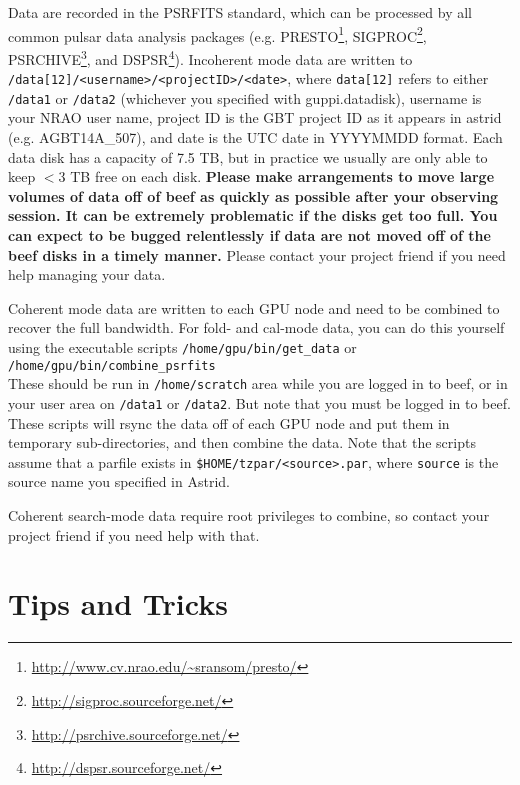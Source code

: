 Data are recorded in the PSRFITS standard, which can be processed by
all common pulsar data analysis packages
(e.g. PRESTO\footnote{\url{http://www.cv.nrao.edu/~sransom/presto/}},
SIGPROC\footnote{\url{http://sigproc.sourceforge.net/}},
PSRCHIVE\footnote{\url{http://psrchive.sourceforge.net/}}, and
DSPSR\footnote{\url{http://dspsr.sourceforge.net/}}).  Incoherent mode
data are written to \texttt{/data[12]/<username>/<projectID>/<date>},
where \texttt{data[12]} refers to either \texttt{/data1} or
\texttt{/data2} (whichever you specified with guppi.datadisk),
username is your NRAO user name, project ID is the GBT project ID as
it appears in astrid (e.g. AGBT14A\_507), and date is the UTC date in
YYYYMMDD format.  Each data disk has a capacity of 7.5 TB, but in
practice we usually are only able to keep $< 3$ TB free on each
disk.  \textbf{Please make arrangements to move large volumes of data
  off of beef as quickly as possible after your observing session.  It
  can be extremely problematic if the disks get too full.  You can
  expect to be bugged relentlessly if data are not moved off of the
  beef disks in a timely manner.}  Please contact your project friend
if you need help managing your data.

Coherent mode data are written to each GPU node and need to be
combined to recover the full bandwidth.  For fold- and cal-mode data,
you can do this yourself using the executable scripts \hfil\break
\texttt{/home/gpu/bin/get\_data} or
\hfil\break \texttt{/home/gpu/bin/combine\_psrfits} \\
These should be run in \texttt{/home/scratch} area while you are
logged in to beef, or in your user area on \texttt{/data1} or
\texttt{/data2}.  But note that you must be logged in to beef.  These
scripts will rsync the data off of each GPU node and put them in
temporary sub-directories, and then combine the data.  Note that the
scripts assume that a parfile exists in
\texttt{\$HOME/tzpar/<source>.par}, where \texttt{source} is the
source name you specified in Astrid.

Coherent search-mode data require root privileges to combine, so
contact your project friend if you need help with that.

\section{Tips and Tricks}
\label{sec:tips}

